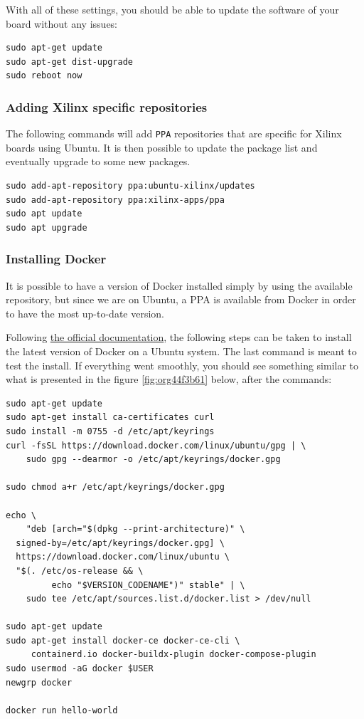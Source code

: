 \documentclass[10pt]{article}
\begin{document}
With all of these settings, you should be able to update the software of your
board without any issues:
\begin{verbatim}
sudo apt-get update
sudo apt-get dist-upgrade
sudo reboot now
\end{verbatim}

\subsubsection{Adding Xilinx specific repositories}
\label{sec:orge1ebf5b}
The following commands will add \texttt{PPA} repositories that are specific for Xilinx boards using Ubuntu.
It is then possible to update the package list and eventually upgrade to some new packages.
\begin{verbatim}
sudo add-apt-repository ppa:ubuntu-xilinx/updates
sudo add-apt-repository ppa:xilinx-apps/ppa
sudo apt update
sudo apt upgrade
\end{verbatim}

\subsubsection{Installing Docker}
\label{sec:org5307b8d}
It is possible to have a version of Docker installed simply by using the available repository,
but since we are on Ubuntu, a PPA is available from Docker in order to have the most up-to-date version.

Following \href{https://docs.docker.com/engine/install/ubuntu/\#install-using-the-repository}{the official documentation}, the following steps can be taken to install the latest version of
Docker on a Ubuntu system. The last command is meant to test the install.
If everything went smoothly, you should see something similar to what is presented
in the figure \ref{fig:org44f3b61} below, after the commands:

\begin{verbatim}
sudo apt-get update
sudo apt-get install ca-certificates curl
sudo install -m 0755 -d /etc/apt/keyrings
curl -fsSL https://download.docker.com/linux/ubuntu/gpg | \
    sudo gpg --dearmor -o /etc/apt/keyrings/docker.gpg

sudo chmod a+r /etc/apt/keyrings/docker.gpg

echo \
    "deb [arch="$(dpkg --print-architecture)" \
  signed-by=/etc/apt/keyrings/docker.gpg] \
  https://download.docker.com/linux/ubuntu \
  "$(. /etc/os-release && \
         echo "$VERSION_CODENAME")" stable" | \
    sudo tee /etc/apt/sources.list.d/docker.list > /dev/null

sudo apt-get update
sudo apt-get install docker-ce docker-ce-cli \
     containerd.io docker-buildx-plugin docker-compose-plugin
sudo usermod -aG docker $USER
newgrp docker

docker run hello-world
\end{verbatim}
\end{document}
